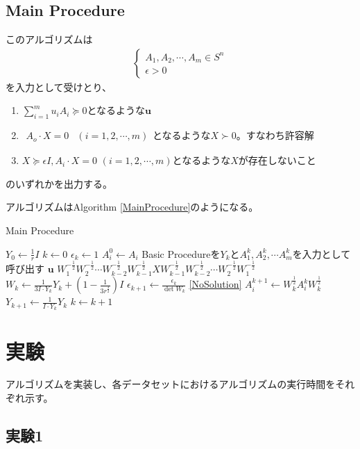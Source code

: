 \subsection{Main Procedure}
このアルゴリズムは
\begin{align*}
  \left\{
    \begin{array}{l}
      A_1, A_2, \cdots, A_m \in S^n \\
      \epsilon > 0
    \end{array}
  \right.
\end{align*}
を入力として受けとり、
\begin{enumerate}[label=(\alph*)]
  \item $\displaystyle{\sum_{i = 1}^m u_i A_i \succeq 0}$となるような$\mathbf{u}$ \label{DualSolution}
  \item $\begin{array}{ll} A_o \cdot X = 0 & (i = 1, 2, \cdots, m) \end{array}$となるような$X \succ 0$。すなわち許容解 \label{FeasibleSolution}
  \item $X \succeq \epsilon I, A_i \cdot X = 0 \,\, (i = 1, 2, \cdots, m)$となるような$X$が存在しないこと \label{NoSolution}
\end{enumerate}
のいずれかを出力する。

アルゴリズムはAlgorithm \ref{MainProcedure}のようになる。
\begin{algorithm}
  \caption{Main Procedure}
  \label{MainProcedure}
  \begin{algorithmic}[1]
    \State $\displaystyle{Y_0 \leftarrow \frac{1}{r} I}$
    \State $k \leftarrow 0$
    \State $\epsilon_k \leftarrow 1$
      \State $A_i^0 \leftarrow A_i$
    \EndFor
    \State Basic Procedureを$Y_k$と$A_1^k, A_2^k, \cdots A_m^k$を入力として呼び出す \label{CallBasicProcedure}
      \State \Return $\mathbf{u}$
      \State \Return $\displaystyle{W_1^{-\frac{1}{2}} W_2^{-\frac{1}{2}} \cdots W_{k - 2}^{-\frac{1}{2}} W_{k - 1}^{-\frac{1}{2}} X W_{k - 1}^{-\frac{1}{2}} W_{k - 2}^{-\frac{1}{2}} \cdots W_2^{-\frac{1}{2}} W_1^{-\frac{1}{2}}}$
    \EndIf
    \State $\displaystyle{W_k \leftarrow \frac{1}{3 I \cdot Y_k} Y_k + (1 - \frac{1}{3 r^\frac{3}{2}}) I}$
    \State $\displaystyle{\epsilon_{k + 1} \leftarrow \frac{\epsilon_k}{\det W_k}}$
      \State \Return \ref{NoSolution}
    \EndIf
      \State $\displaystyle{A_i^{k + 1} \leftarrow W_k^\frac{1}{2} A_i^k W_k^\frac{1}{2}}$
    \EndFor
    \State $\displaystyle{Y_{k + 1} \leftarrow \frac{1}{I \cdot Y_k} Y_k}$
    \State $k \leftarrow k + 1$
    \State {}
  \end{algorithmic}
\end{algorithm}


\section{実験}
アルゴリズムを実装し、各データセットにおけるアルゴリズムの実行時間をそれぞれ示す。

\subsection{実験1}

